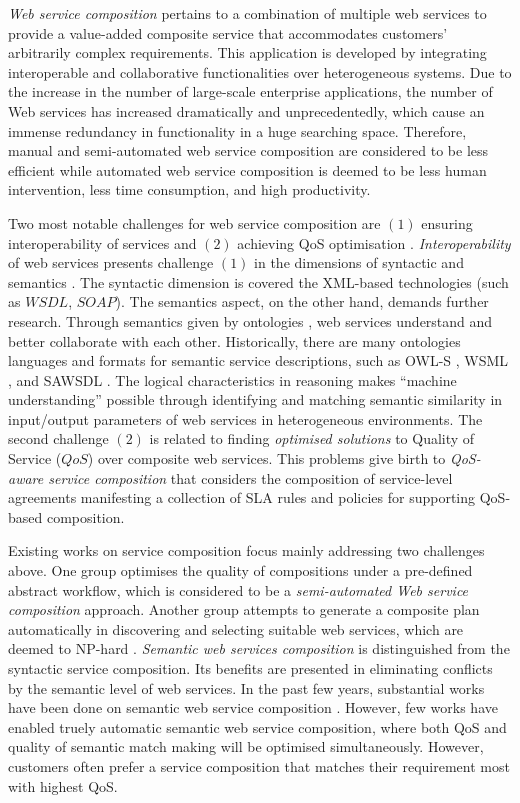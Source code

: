 \documentclass{llncs}
\begin{document}
\textit{Web service composition} pertains to a combination of multiple web services to provide a value-added composite service that accommodates customers' arbitrarily complex requirements. This application is developed by integrating interoperable and collaborative functionalities over heterogeneous systems. Due to the increase in the number of large-scale enterprise applications, the number of Web services has increased dramatically and unprecedentedly, which cause an immense redundancy in functionality in a huge searching space. Therefore, manual and semi-automated web service composition are considered to be less efficient while automated web service composition is deemed to be less human intervention, less time consumption, and high productivity.

Two most notable challenges for web service composition are $(1)$ ensuring interoperability of services and $(2)$ achieving QoS optimisation \cite{fensel2011semantic}. \textit{Interoperability} of web services presents challenge $(1)$ in the dimensions of syntactic and semantics \cite{fensel2011semantic}. The syntactic dimension is covered the XML-based technologies (such as $WSDL$, $SOAP$). The semantics aspect, on the other hand, demands further research. Through semantics given by ontologies \cite{o2005review}, web services understand and better collaborate with each other. Historically, there are many ontologies languages and formats for semantic service descriptions, such as OWL-S \cite{martin2004owl}, WSML \cite{fensel2006enabling}, and SAWSDL \cite{lausen2007semantic}. The logical characteristics in reasoning makes ``machine understanding'' possible through identifying and matching semantic similarity in input/output parameters of web services in heterogeneous environments. The second challenge $(2)$ is related to finding \textit{optimised solutions} to Quality of Service ($QoS$) over composite web services. This problems give birth to \textit{QoS-aware service composition} that considers the composition of service-level agreements \cite {sahai2002automated} manifesting a collection of SLA rules and policies for supporting QoS-based composition.

Existing works on service composition focus mainly addressing two challenges above. One group optimises the quality of compositions under a pre-defined abstract workflow, which is considered to be a \textit{semi-automated Web service composition} approach. Another group attempts to generate a composite plan automatically in discovering and selecting suitable web services, which are deemed to NP-hard \cite{moghaddam2014service}. \textit{Semantic web services composition} is distinguished from the syntactic service composition. Its benefits are presented in eliminating conflicts by the semantic level of web services. In the past few years, substantial works have been done on semantic web service composition \cite{fensel2011semantic,lecue2009optimizing}. However, few works have enabled truely automatic semantic web service composition, where both QoS and quality of semantic match making will be optimised simultaneously. However, customers often prefer a service composition that matches their requirement most with highest QoS.
\end{document}
